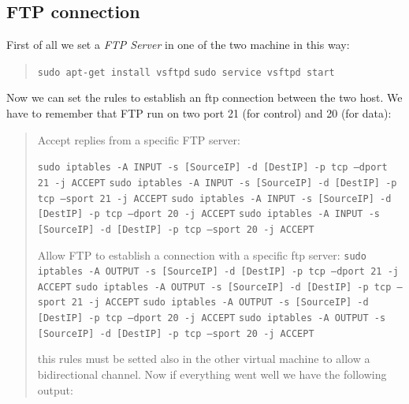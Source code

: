 \documentclass[11pt]{article}
\begin{document}
\subsection{FTP connection}
First of all we set a {\em FTP Server} in one of the two machine in this way:

\begin{quote}
  \texttt{sudo apt-get install vsftpd}\newline
  \texttt{sudo service vsftpd start}\newline
\end{quote}

Now we can set the rules to establish an ftp connection between the two host. We have to remember that FTP run on two port 21 (for control) and 20 (for data):

\begin{quote}
  Accept replies from a specific FTP server:

  \texttt{sudo iptables -A INPUT -s [SourceIP] -d [DestIP] -p tcp --dport 21 -j ACCEPT}\newline
  \texttt{sudo iptables -A INPUT -s [SourceIP] -d [DestIP] -p tcp --sport 21 -j ACCEPT}\newline
  \texttt{sudo iptables -A INPUT -s [SourceIP] -d [DestIP] -p tcp --dport 20 -j ACCEPT}\newline
  \texttt{sudo iptables -A INPUT -s [SourceIP] -d [DestIP] -p tcp --sport 20 -j ACCEPT}\newline

  Allow FTP to establish a connection with a specific ftp server:
  \texttt{sudo iptables -A OUTPUT -s [SourceIP] -d [DestIP] -p tcp --dport 21 -j ACCEPT}\newline
  \texttt{sudo iptables -A OUTPUT -s [SourceIP] -d [DestIP] -p tcp --sport 21 -j ACCEPT}\newline
  \texttt{sudo iptables -A OUTPUT -s [SourceIP] -d [DestIP] -p tcp --dport 20 -j ACCEPT}\newline
  \texttt{sudo iptables -A OUTPUT -s [SourceIP] -d [DestIP] -p tcp --sport 20 -j ACCEPT}\newline

  this rules must be setted also in the other virtual machine to allow a bidirectional channel. Now if everything went well we have the following output:


\end{quote}
\end{document}

